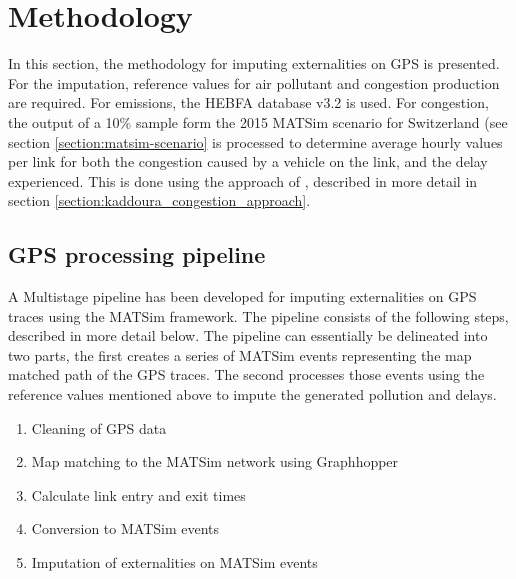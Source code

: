 \section{Methodology}

In this section, the methodology for imputing externalities on GPS is presented. For the imputation, reference values for air pollutant and congestion production are required. For emissions, the HEBFA database v3.2 is used. 
For congestion, the output of a 10\% sample form the 2015 MATSim scenario for Switzerland (see section \ref{section:matsim-scenario} is processed to determine average hourly values per link for both the congestion caused by a vehicle on the link, and the delay experienced. 
This is done using the approach of \citet{kaddoura2015marginal}, described in more detail in section \ref{section:kaddoura_congestion_approach}.

\subsection{GPS processing pipeline}


 A Multistage pipeline has been developed for imputing externalities on GPS traces using the MATSim framework. 
 The pipeline consists of the following steps, described in more detail below. 
 The pipeline can essentially be delineated into two parts, the first creates a series of MATSim events representing the map matched path of the GPS traces. 
 The second processes those events using the reference values mentioned above to impute the generated pollution and delays.

\begin{enumerate}
 	\item Cleaning of GPS data
 	\item Map matching to the MATSim network using Graphhopper
 	\item Calculate link entry and exit times
 	\item Conversion to MATSim events
	\item Imputation of externalities on MATSim events
\end{enumerate}


